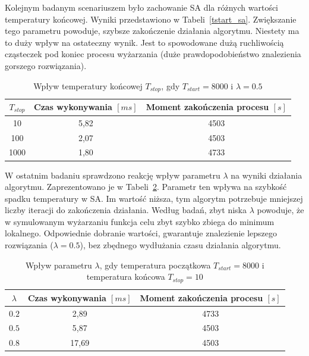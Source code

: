 Kolejnym badanym scenariuszem było zachowanie SA dla różnych wartości temperatury końcowej. Wyniki przedstawiono w Tabeli~\ref{tstart_sa}. Zwiększanie tego parametru powoduje, szybsze zakończenie działania algorytmu. Niestety ma to duży wpływ na ostateczny wynik. Jest to spowodowane dużą ruchliwością cząsteczek pod koniec procesu wyżarzania (duże prawdopodobieństwo znalezienia gorszego rozwiązania).
\begin{table}[H]
	\centering
	\label{tstop_sa}
	\caption{Wpływ temperatury końcowej $T_{stop}$, gdy $T_{start}=8000$ i $\lambda=0.5$}
	\begin{tabular}{ccc}
		\toprule
		$T_{stop}$ & Czas wykonywania $[ms]$ & Moment zakończenia procesu $[s]$ \\
		\midrule
		10         & 5,82                    & 4503                              \\
		100        & 2,07                    & 4503                              \\
		1000       & 1,80                    & 4733                              \\
		\bottomrule
	\end{tabular}
\end{table}

\newpage
W ostatnim badaniu sprawdzono reakcję wpływ parametru $\lambda$ na wyniki działania algorytmu. Zaprezentowano je w Tabeli~\ref{lamda_sa}. Parametr ten wpływa na szybkość spadku temperatury w SA\@. Im wartość niższa, tym algorytm potrzebuje mniejszej liczby iteracji do zakończenia działania.
Według badań, zbyt niska $\lambda$ powoduje, że w symulowanym wyżarzaniu funkcja celu zbyt szybko zbiega do minimum lokalnego.
Odpowiednie dobranie wartości, gwarantuje znalezienie lepszego rozwiązania ($\lambda = 0.5$), bez zbędnego wydłużania czasu działania algorytmu.

\begin{table}[H]
	\centering
	\caption{Wpływ parametru $\lambda$, gdy temperatura początkowa $T_{start}=8000$ i temperatura końcowa $T_{stop}=10$}
	\label{lamda_sa}
	\begin{tabular}{ccc}
		\toprule
		$\lambda$ & Czas wykonywania $[ms]$ & Moment zakończenia procesu $[s]$ \\
		\midrule
		$0.2$     & 2,89                    & 4733                              \\
		$0.5$     & 5,87                    & 4503                              \\
		$0.8$     & 17,69                   & 4503                              \\
		\bottomrule
	\end{tabular}
\end{table}


